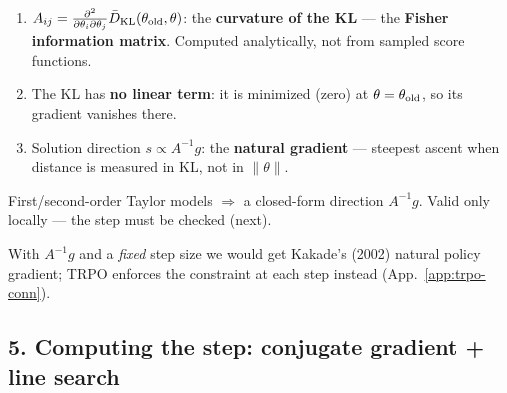 \begin{enumerate}
  \item $A_{ij}=\frac{\partial^2}{\partial\theta_i\partial\theta_j}\bar D_{\mathrm{KL}}(\theta_{\mathrm{old}},\theta)$: the \textbf{curvature of the KL} --- the \textbf{Fisher information matrix}. Computed analytically, not from sampled score functions.
  \item The KL has \textbf{no linear term}: it is minimized (zero) at $\theta=\theta_{\mathrm{old}}$, so its gradient vanishes there.
  \item Solution direction $s\propto A^{-1}g$: the \textbf{natural gradient} --- steepest ascent when distance is measured in KL, not in $\|\theta\|$.
\end{enumerate}

     {First/second-order Taylor models $\Rightarrow$ a closed-form direction $A^{-1}g$.}
     {Valid only locally --- the step must be checked (next).}

{\small With $A^{-1}g$ and a \emph{fixed} step size we would get Kakade's (2002) natural policy gradient; TRPO enforces the constraint at each step instead (App.~\ref{app:trpo-conn}).}

\subsection{5. Computing the step: conjugate gradient + line search}

